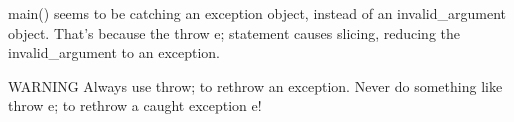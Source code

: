 main() seems to be catching an exception object, instead of an invalid\_argument object. That’s because the throw e; statement causes slicing, reducing the invalid\_argument to an exception.

\begin{myWarning}{WARNING}
Always use throw; to rethrow an exception. Never do something like throw e; to rethrow a caught exception e!
\end{myWarning}














